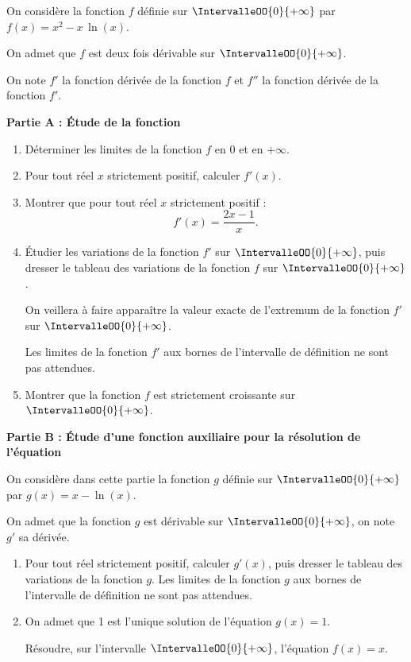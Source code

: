 On considère la fonction $f$ définie sur $\IntervalleOO{0}{+\infty}$ par $f(x) = x^2 - x\,\ln(x)$.

On admet que $f$ est deux fois dérivable sur $\IntervalleOO{0}{+\infty}$.

On note $f'$ la fonction dérivée de la fonction $f$ et $f''$ la fonction dérivée de la fonction $f'$.

\medskip

\textbf{Partie A : Étude de la fonction }

\smallskip

\begin{enumerate}
	\item Déterminer les limites de la fonction $f$ en $0$ et en $+\infty$.
	\item Pour tout réel $x$ strictement positif, calculer $f'(x)$.
	\item Montrer que pour tout réel $x$ strictement positif : \[ f'(x)=\frac{2x-1}{x}. \]
	\item Étudier les variations de la fonction $f'$ sur $\IntervalleOO{0}{+\infty}$, puis dresser le tableau des variations de la fonction $f$ sur $\IntervalleOO{0}{+\infty}$.
	
	On veillera à faire apparaître la valeur exacte de l'extremum de la fonction $f'$ sur $\IntervalleOO{0}{+\infty}$.
	
	Les limites de la fonction $f'$ aux bornes de l'intervalle de définition ne sont pas attendues.
	\item Montrer que la fonction $f$ est strictement croissante sur $\IntervalleOO{0}{+\infty}$.
\end{enumerate}

\smallskip

\textbf{Partie B : Étude d'une fonction auxiliaire pour la résolution de l'équation }

\medskip

On considère dans cette partie la fonction $g$ définie sur $\IntervalleOO{0}{+\infty}$ par $g(x) = x-\ln(x)$.

On admet que la fonction $g$ est dérivable sur $\IntervalleOO{0}{+\infty}$, on note $g'$ sa dérivée.

\begin{enumerate}
	\item Pour tout réel strictement positif, calculer $g'(x)$, puis dresser le tableau des variations de la fonction $g$. Les limites de la fonction $g$ aux bornes de l'intervalle de définition ne sont pas attendues.
	\item On admet que 1 est l'unique solution de l'équation $g(x) = 1$.
	
	Résoudre, sur l'intervalle $\IntervalleOO{0}{+\infty}$, l'équation $f(x) = x$.
\end{enumerate}

